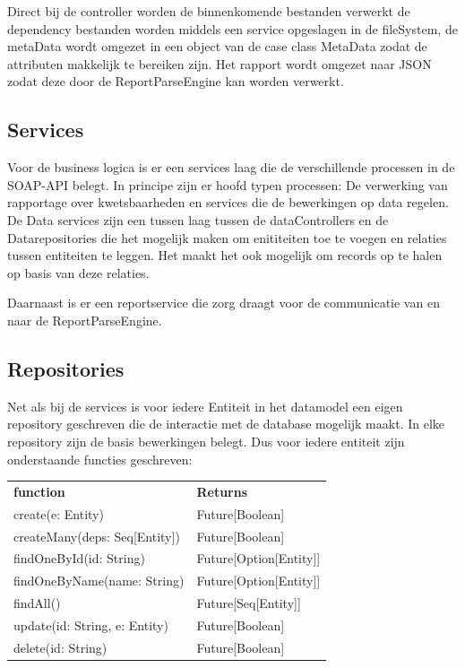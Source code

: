 Direct bij de controller worden de binnenkomende bestanden verwerkt de dependency bestanden worden middels een service opgeslagen in de fileSystem, de metaData wordt omgezet in een object van de case class MetaData zodat de attributen makkelijk te bereiken zijn. Het rapport wordt omgezet naar JSON zodat deze door de ReportParseEngine kan worden verwerkt.

\subsection{Services}\label{subsec:Services}
Voor de business logica is er een services laag die de verschillende processen in de SOAP-API belegt. In principe zijn er hoofd typen processen: De verwerking van rapportage over kwetsbaarheden en services die de bewerkingen op data regelen.
De Data services zijn een tussen laag tussen de dataControllers en de Datarepositories die het mogelijk maken om enititeiten toe te voegen en relaties tussen entiteiten te leggen. Het maakt het ook mogelijk om records op te halen op basis van deze relaties.

Daarnaast is er een reportservice die zorg draagt voor de communicatie van en naar de ReportParseEngine.



\subsection{Repositories}\label{subsec:repositories}
Net als bij de services is voor iedere Entiteit in het datamodel een eigen repository geschreven die de interactie met de database mogelijk maakt. In elke repository zijn de basis bewerkingen belegt. Dus voor iedere entiteit zijn onderstaande functies geschreven:

\begin{tabular}{ll}
    \textbf{function} & \textbf{Returns}\\
    create(e: Entity) & Future[Boolean] \\
    createMany(deps: Seq[Entity])& Future[Boolean]\\
    findOneById(id: String) & Future[Option[Entity]]\\
    findOneByName(name: String) & Future[Option[Entity]]\\
    findAll() & Future[Seq[Entity]] \\
    update(id: String, e: Entity) & Future[Boolean]\\
    delete(id: String) & Future[Boolean] \\
\end{tabular} \\

